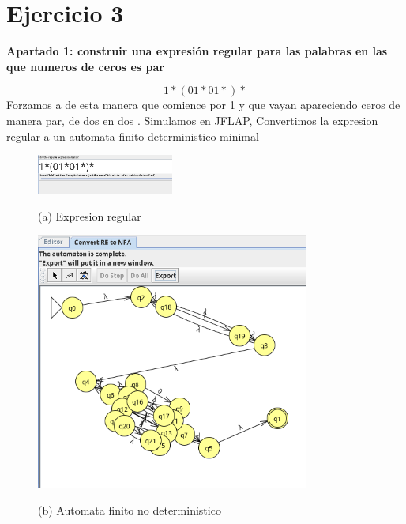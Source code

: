 \documentclass{article}
\begin{document}
        \newpage

        \section*{Ejercicio 3}
        \textbf{Apartado 1: construir una expresión regular para las palabras en las que numeros de ceros es par}
        
        \vspace{\baselineskip} %

        $$ 1*(01*01*)*$$
        Forzamos a de esta manera que comience por 1 y que vayan apareciendo ceros de manera par, de dos en dos
        . Simulamos en JFLAP, Convertimos la expresion regular a un automata finito deterministico minimal
        
        \begin{figure}[!h]
            \centering
            \includegraphics[width=0.4\textwidth]{./Imagenes/image19.png}
            \label{fig:label4}
            \caption*{(a) Expresion regular}
        \end{figure}

        \begin{figure}[!h]
            \centering
            \includegraphics[width=0.8\textwidth]{./Imagenes/image14.png}
            \label{fig:label4}
            \caption*{(b) Automata finito no deterministico}
        \end{figure}
\end{document}
